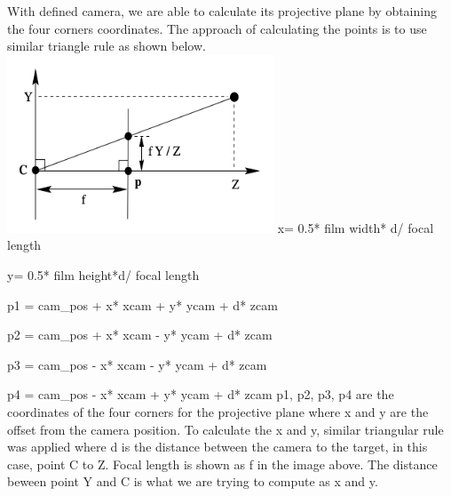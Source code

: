 \documentclass[11pt]{article}
\makeatletter
\def\maxwidth{\ifdim\Gin@nat@width>\linewidth\linewidth
    \else\Gin@nat@width\fi}
\let\Oldincludegraphics\includegraphics
\renewcommand{\includegraphics}[1]{\Oldincludegraphics[width=.8\maxwidth]{#1}}
\makeatother
\begin{document}
    With defined camera, we are able to calculate its projective plane by
obtaining the four corners coordinates. The approach of calculating the
points is to use similar triangle rule as shown below.
\includegraphics{proj1.png}
x= 0.5* film width* d/ focal length
    
y= 0.5* film height*d/ focal length

p1 = cam_pos + x* xcam + y* ycam + d* zcam

p2 = cam_pos + x* xcam - y* ycam + d* zcam

p3 = cam_pos - x* xcam - y* ycam + d* zcam

p4 = cam_pos - x* xcam + y* ycam + d* zcam 
    p1, p2, p3, p4 are the coordinates of the four corners for the
projective plane where x and y are the offset from the camera position.
To calculate the x and y, similar triangular rule was applied where d is
the distance between the camera to the target, in this case, point C to
Z. Focal length is shown as f in the image above. The distance beween
point Y and C is what we are trying to compute as x and y.
\end{document}
